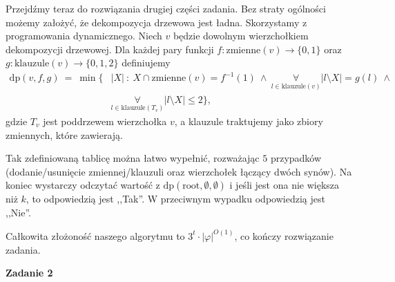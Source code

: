 \documentclass[12pt]{article}
\begin{document}
	\medskip
	
	Przejdźmy teraz do rozwiązania drugiej części zadania. Bez straty ogólności
	możemy założyć, że dekompozycja drzewowa jest ładna. Skorzystamy z
	programowania dynamicznego. Niech \(v\) będzie dowolnym wierzchołkiem
	dekompozycji drzewowej. Dla każdej pary funkcji \(f : \text{zmienne}(v) \to
	\{0, 1\}\) oraz \(g : \text{klauzule}(v) \to \{0, 1, 2\}\) definiujemy
	\begin{align*}
		\text{dp}(v, f, g) \ = \ \min \bigg\{ &|X| \ : \ X \cap
		\text{zmienne}(v) = f^{-1}(1) \ \wedge \ \underset{l \in
		\text{klauzule}(v)}{\forall} |l	\setminus X| = g(l) \ \wedge \\
		&\underset{l \in \text{klauzule}(T_{v})}{\forall} |l \setminus X|
		\leqslant 2 \bigg\} \text{,}
	\end{align*}
	gdzie \(T_{v}\) jest poddrzewem wierzchołka \(v\), a klauzule traktujemy
	jako zbiory zmiennych, które zawierają.
	
	\medskip
	
	Tak zdefiniowaną tablicę można łatwo wypełnić, rozważając \(5\) przypadków
	(dodanie/usunięcie zmiennej/klauzuli oraz wierzchołek łączący dwóch synów).
	Na koniec wystarczy odczytać wartość z \(\text{dp}(\text{root}, \emptyset,
	\emptyset)\) i jeśli jest ona nie większa niż \(k\), to odpowiedzią jest
	,,Tak''. W przeciwnym wypadku odpowiedzią jest ,,Nie''.
	
	\medskip
	
	Całkowita złożoność naszego algorytmu to \(3^{t} \cdot |\varphi|^{O(1)}\),
	co kończy rozwiązanie zadania.
	
	\newpage
	
	\textbf{Zadanie 2}
	
	\medskip
	
\end{document}
